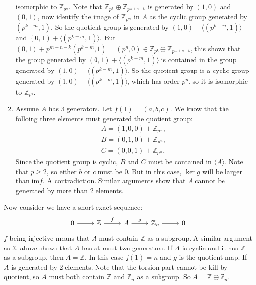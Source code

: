 \documentclass[a4paper, 11pt]{article}
\begin{document}
\begin{solution}
\begin{enumerate}
          isomorphic to \(\mathbb{Z}_{p^n}\). Note that \(\mathbb{Z}_{p^k}\oplus \mathbb{Z}_{p^{m+n-k}}\) is generated by \((1,0)\) and \((0,1)\), now identify the image of \(\mathbb{Z}_{p^m}\) in \(A\) as 
          the cyclic group generated by \((p^{k-m},1)\). So the quotient group is generated by \((1,0)+\langle (p^{k-m},1)\rangle\) and \((0,1)+\langle (p^{k-m},1)\rangle\). But \((0,1)+p^{m+n-k}(p^{k-m},1)=(p^n,0)\in \mathbb{Z}_{p^k}\oplus \mathbb{Z}_{p^{m+n-k}}\), 
          this shows that the group generated by \((0,1)+\langle (p^{k-m},1)\rangle\) is contained in the group generated by \((1,0)+\langle (p^{k-m},1)\rangle\). So the quotient group is a cyclic group generated by \((1,0)+\langle (p^{k-m},1)\rangle\), which has 
          order \(p^n\), so it is isomorphic to \(\mathbb{Z}_{p^n}\).
     \item Assume \(A\) has 3 generators. Let \(f(1)=(a,b,c)\). We know that the folloing three elements must generated the quotient group:
          \begin{align*}
            A=(1,0,0)+\mathbb{Z}_{p^m},\\ 
            B=(0,1,0)+\mathbb{Z}_{p^m},\\ 
            C=(0,0,1)+\mathbb{Z}_{p^m},
          \end{align*}
          Since the quotient group is cyclic, \(B\) and \(C\) must be contained in \(\langle A\rangle\). Note that \(p\geq 2\), so either \(b\) or \(c\) must be 0. But in this case, \(\ker g\) will be larger than 
          \(\text{im} f\). A contradiction. Similar arguments show that \(A\) cannot be generated by more than 2 elements.
\end{enumerate}
\par 
Now consider we have a short exact sequence:
$$\begin{tikzcd}
	0 & {\mathbb{Z}} & A & {\mathbb{Z}_n} & 0
	\arrow[from=1-1, to=1-2]
	\arrow["f", from=1-2, to=1-3]
	\arrow["g", from=1-3, to=1-4]
	\arrow[from=1-4, to=1-5]
\end{tikzcd}$$
\(f\) being injective means that \(A\) must contain \(\mathbb{Z}\) as a subgroup. A similar argument as 3. above shows that \(A\) has at most two generators. If \(A\) is cyclic and it has \(\mathbb{Z}\) as a subgroup, then \(A=\mathbb{Z}\). In this case \(f(1)=n\) and \(g\) is the quotient map. If 
\(A\) is generated by 2 elements. Note that the torsion part cannot be kill by quotient, so \(A\) must both contain \(\mathbb{Z}\) and \(\mathbb{Z}_n\) as a subgroup. So \(A=\mathbb{Z}\oplus \mathbb{Z}_n\).
\end{solution}
\end{document}
